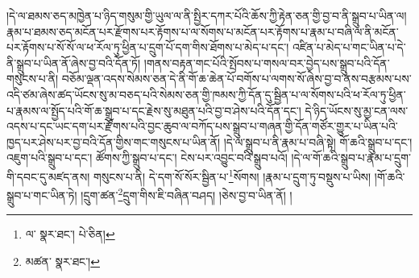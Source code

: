 །དེ་ལ་ཐམས་ཅད་མཁྱེན་པ་ཉིད་གསུམ་གྱི་ཡུལ་ལ་ནི་སྤྱིར་དཀར་པོའི་ཆོས་ཀྱི་རྟེན་ཅན་གྱི་བྱ་བ་ནི་སྒྲུབ་པ་ཡིན་ལ། རྣམ་པ་ཐམས་ཅད་མངོན་པར་རྫོགས་པར་རྟོགས་པ་ལ་སོགས་པ་མངོན་པར་རྟོགས་པ་རྣམ་པ་བཞི་ལ་ནི་མངོན་པར་རྟོགས་པ་སོ་སོ་ལ་ཕ་རོལ་ཏུ་ཕྱིན་པ་དྲུག་པོ་དག་གིས་ཐོགས་པ་མེད་པ་དང་། འཛིན་པ་མེད་པ་གང་ཡིན་པ་དེ་ནི་སྒྲུབ་པ་ཡིན་ནོ་ཞེས་བྱ་བའི་དོན་ཏོ། །གནས་བརྟན་གང་པོའི་སྤོབས་པ་གསལ་བར་བྱེད་པས་སྒྲུབ་པའི་དོན་གསུངས་པ་ནི། བཅོམ་ལྡན་འདས་སེམས་ཅན་དེ་ནི་གོ་ཆ་ཆེན་པོ་བགོས་པ་ལགས་སོ་ཞེས་བྱ་བ་ནས་བརྩམས་པས་འདི་ཙམ་ཞེས་ཚད་ཡོངས་སུ་མ་བཅད་པའི་སེམས་ཅན་གྱི་ཁམས་ཀྱི་དོན་དུ་སྦྱིན་པ་ལ་སོགས་པའི་ཕ་རོལ་ཏུ་ཕྱིན་པ་རྣམས་ལ་སྤྱོད་པའི་གོ་ཆ་སྒྲུབ་པ་དང་རྗེས་སུ་མཐུན་པའི་བྱ་བ་ཤེས་པའི་དོན་དང་། དེ་ཉིད་ཡོངས་སུ་མྱ་ངན་ལས་འདས་པ་དང་ཡང་དག་པར་རྫོགས་པའི་བྱང་ཆུབ་ལ་བཀོད་པས་སྒྲུབ་པ་གཞན་གྱི་དོན་གཙོར་གྱུར་པ་ཡིན་པའི་ཁྱད་པར་ཤེས་པར་བྱ་བའི་དོན་གྱིས་གང་གསུངས་པ་ཡིན་ནོ། །དེ་ལ་སྒྲུབ་པ་ནི་རྣམ་པ་བཞི་སྟེ། གོ་ཆའི་སྒྲུབ་པ་དང་། འཇུག་པའི་སྒྲུབ་པ་དང་། ཚོགས་ཀྱི་སྒྲུབ་པ་དང་། ངེས་པར་འབྱུང་བའི་སྒྲུབ་པའོ། །དེ་ལ་གོ་ཆའི་སྒྲུབ་པ་རྣམ་པ་དྲུག་གི་དབང་དུ་མཛད་ནས། གསུངས་པ་ནི། དེ་དག་སོ་སོར་སྦྱིན་པ་\footnote{ལ་  སྣར་ཐང་།  པེ་ཅིན། }སོགས། །རྣམ་པ་དྲུག་ཏུ་བསྡུས་པ་ཡིས། །གོ་ཆའི་སྒྲུབ་པ་གང་ཡིན་ཏེ། །དྲུག་ཚན་\footnote{མཚན་  སྣར་ཐང་། }དྲུག་གིས་ཇི་བཞིན་བཤད། །ཅེས་བྱ་བ་ཡིན་ནོ། །

